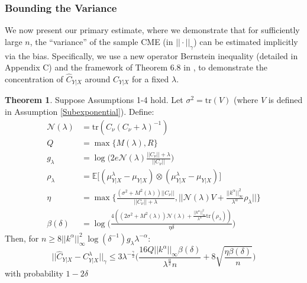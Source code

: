 \documentclass[accepted]{article}
\theoremstyle{definition}
\newtheorem{theorem}{Theorem}
\begin{document}
\subsubsection{Bounding the Variance}
We now present our primary estimate, where we demonstrate that for sufficiently large $n$, the ``variance'' of the sample CME (in $||\cdot||_{\gamma}$) can be estimated implicitly via the bias. Specifically, we use a new operator Bernstein inequality (detailed in Appendix C) and the framework of Theorem 6.8 in \cite{fischer2020sobolev}, to demonstrate the concentration of  $\hat{C}_{Y|X}$ around $C_{Y|X}$ for a fixed $\lambda$. 
\begin{small}
\begin{theorem}
\label{Embedding Concentration}
Suppose Assumptions 1-4 hold. Let $\sigma^2 = \text{tr}(V)$ (where $V$ is defined in Assumption \ref{Subexponential}). Define:
\begin{align*}
    \mathcal{N}(\lambda) & = \text{tr}(C_{\nu}(C_{\nu} + \lambda)^{-1}) \\
    Q & = \max \{M(\lambda), R\} \\
    g_{\lambda} & = \log \Big(2e\mathcal{N}(\lambda)\frac{||C_{\nu}|| + \lambda}{||C_{\nu}||}\Big) \\
    \rho_{\lambda} & = \mathbb{E}\Big[(\mu^{\lambda}_{Y|X} - \mu_{Y|X}) \otimes (\mu^{\lambda}_{Y|X} - \mu_{Y|X})\Big] \\
    \eta & = \max\Big\{\frac{(\sigma^2 + M^2(\lambda))||C_{\nu}||}{||C_{\nu}|| + \lambda}, ||\mathcal{N}(\lambda)V + \frac{||k^{\alpha}||^2_{\infty}}{\lambda^{\alpha}}\rho_{\lambda}||\Big\} \\
    \beta(\delta) & = \log \Big(\frac{4((2\sigma^2 + M^2(\lambda))\mathcal{N}(\lambda) + \frac{||k^{\alpha}||^2_{\infty}}{\lambda^{\alpha}}\text{tr}(\rho_{\lambda}))}{\eta \delta}\Big)
\end{align*}
Then, for $n \geq 8||k^{\alpha}||^2_{\infty}\log(\delta^{-1}) g_{\lambda}\lambda^{-\alpha}$:
\begin{equation}
\label{Variance Bound}
    ||\hat{C}_{Y|X} - C^{\lambda}_{Y|X}||_{\gamma} \leq 3\lambda^{-\frac{\gamma}{2}}\Big(\frac{16Q||k^{\alpha}||_{\infty}\beta(\delta)}{\lambda^{\frac{\alpha}{2}}n} + 8\sqrt{\frac{\eta\beta(\delta)}{n}}\Big) 
\end{equation}
with probability $1 - 2\delta$
\end{theorem}
\end{small}
\end{document}
